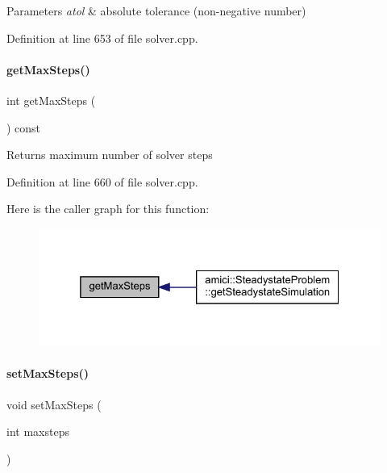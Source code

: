 \begin{DoxyParams}{Parameters}
{\em atol} & absolute tolerance (non-\/negative number) \\
\hline
\end{DoxyParams}


Definition at line 653 of file solver.\+cpp.

\mbox{\label{classamici_1_1_solver_acf39690ae4c940c7734fc3fadabb4d50}} 
\paragraph{\texorpdfstring{get\+Max\+Steps()}{getMaxSteps()}}
{\footnotesize\ttfamily int get\+Max\+Steps (\begin{DoxyParamCaption}{ }\end{DoxyParamCaption}) const}

\begin{DoxyReturn}{Returns}
maximum number of solver steps 
\end{DoxyReturn}


Definition at line 660 of file solver.\+cpp.

Here is the caller graph for this function\+:
\nopagebreak
\begin{figure}[H]
\begin{center}
\leavevmode
\includegraphics[width=325pt]{classamici_1_1_solver_acf39690ae4c940c7734fc3fadabb4d50_icgraph}
\end{center}
\end{figure}
\mbox{\label{classamici_1_1_solver_ab321627a9f9d22013638e0eb9b14d2dc}} 
\paragraph{\texorpdfstring{set\+Max\+Steps()}{setMaxSteps()}}
{\footnotesize\ttfamily void set\+Max\+Steps (\begin{DoxyParamCaption}\item[{int}]{maxsteps }\end{DoxyParamCaption})}


